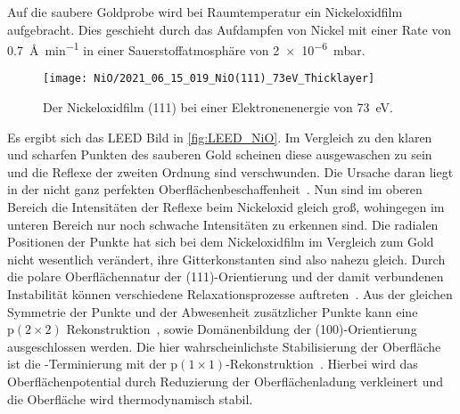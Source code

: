         Auf die saubere Goldprobe wird bei Raumtemperatur ein Nickeloxidfilm aufgebracht.
        Dies geschieht durch das Aufdampfen von Nickel mit einer Rate von \SI{0.7}{\angstrom\per\minute} in einer Sauerstoffatmosphäre von \SI{2e-6}{\milli\bar}.
        \begin{figure}
            \centering
            \texttt{[image: NiO/2021\_06\_15\_019\_NiO(111)\_73eV\_Thicklayer]}
            \caption{Der Nickeloxidfilm (111) bei einer Elektronenenergie von \SI{73}{\electronvolt}.}
            \label{fig:LEED_NiO}
        \end{figure}
        Es ergibt sich das LEED Bild in \autoref{fig:LEED_NiO}.
        Im Vergleich zu den klaren und scharfen Punkten des sauberen Gold scheinen diese ausgewaschen zu sein und die Reflexe der zweiten Ordnung sind verschwunden.
        Die Ursache daran liegt in der nicht ganz perfekten Oberflächenbeschaffenheit~\cite{NiO_34}.
        Nun sind im oberen Bereich die Intensitäten der Reflexe beim Nickeloxid gleich groß, wohingegen im unteren Bereich nur noch schwache Intensitäten zu erkennen sind.
        Die radialen Positionen der Punkte hat sich bei dem Nickeloxidfilm im Vergleich zum Gold nicht wesentlich verändert, ihre Gitterkonstanten sind also nahezu gleich.
        Durch die polare Oberflächennatur der (111)-Orientierung und der damit verbundenen Instabilität können verschiedene Relaxationsprozesse auftreten~\cite{NiO_36, NiO_35, NiO_34, NiO_27, NiO_10}.
        Aus der gleichen Symmetrie der Punkte und der Abwesenheit zusätzlicher Punkte kann eine $\text{p}(2 \times 2)$ Rekonstruktion~\cite{NiO_37}, sowie Domänenbildung der (100)-Orientierung~\cite{NiO_36} ausgeschlossen werden.
        Die hier wahrscheinlichste Stabilisierung der Oberfläche ist die -Terminierung mit der $\text{p}(1 \times 1)$-Rekonstruktion~\cite{NiO_35}.
        Hierbei wird das Oberflächenpotential durch Reduzierung der Oberflächenladung verkleinert und die Oberfläche wird thermodynamisch stabil.


